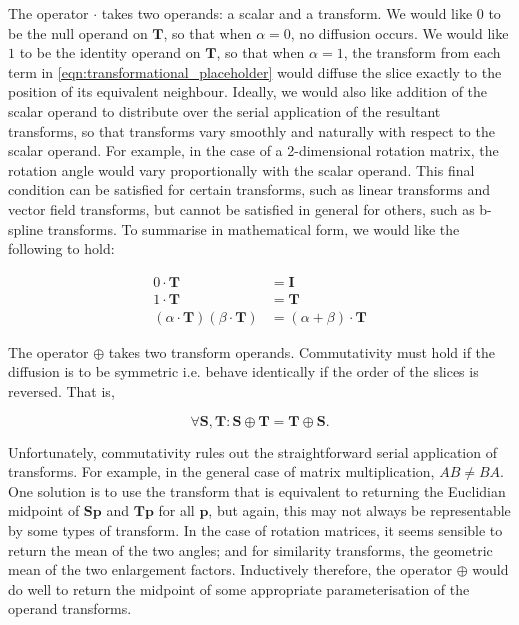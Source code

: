 		The operator $\cdot$ takes two operands: a scalar and a transform. We would like $0$ to be the null operand on $\mathbf{T}$, so that when $\alpha = 0$, no diffusion occurs. We would like $1$ to be the identity operand on $\mathbf{T}$, so that when $\alpha = 1$, the transform from each term in \ref{eqn:transformational_placeholder} would diffuse the slice exactly to the position of its equivalent neighbour. Ideally, we would also like addition of the scalar operand to distribute over the serial application of the resultant transforms, so that transforms vary smoothly and naturally with respect to the scalar operand. For example, in the case of a 2-dimensional rotation matrix, the rotation angle would vary proportionally with the scalar operand. This final condition can be satisfied for certain transforms, such as linear transforms and vector field transforms, but cannot be satisfied in general for others, such as b-spline transforms. To summarise in mathematical form, we would like the following to hold:
		
		\begin{align}
			0 \cdot \mathbf{T} &= \mathbf{I} \label{eqn:null} \\
			1 \cdot \mathbf{T} &= \mathbf{T} \label{eqn:identity} \\
			(\alpha \cdot \mathbf{T}) (\beta \cdot \mathbf{T}) &= (\alpha + \beta) \cdot \mathbf{T} \label{eqn:distributivity}
		\end{align}
	 	
	  The operator $\oplus$ takes two transform operands. Commutativity must hold if the diffusion is to be symmetric i.e. behave identically if the order of the slices is reversed. That is,
		
		\begin{equation}
			\forall \mathbf{S}, \mathbf{T} : \mathbf{S} \oplus \mathbf{T} = \mathbf{T} \oplus \mathbf{S}. \label{eqn:commutativity}
		\end{equation}
		
		Unfortunately, commutativity rules out the straightforward serial application of transforms. For example, in the general case of matrix multiplication, $AB \ne BA$. One solution is to use the transform that is equivalent to returning the Euclidian midpoint of $\mathbf{Sp}$ and $\mathbf{Tp}$ for all $\mathbf{p}$, but again, this may not always be representable by some types of transform. In the case of rotation matrices, it seems sensible to return the mean of the two angles; and for similarity transforms, the geometric mean of the two enlargement factors. Inductively therefore, the operator $\oplus$ would do well to return the midpoint of some appropriate parameterisation of the operand transforms.
		
